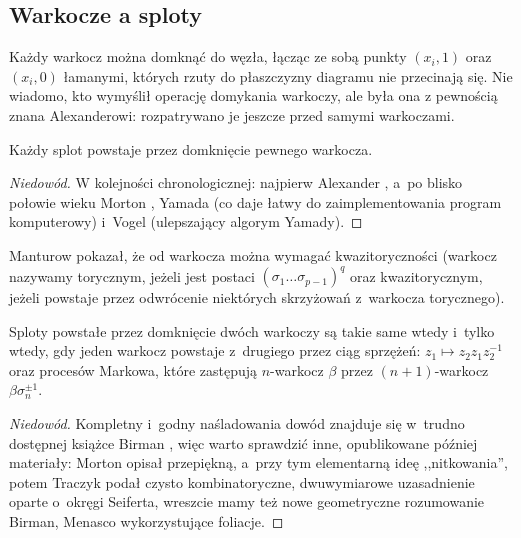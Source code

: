 
\subsection{Warkocze a sploty}
Każdy warkocz można domknąć do węzła, łącząc ze sobą punkty $(x_i, 1)$ oraz $(x_i, 0)$ łamanymi, których rzuty do płaszczyzny diagramu nie przecinają się.
%
Nie wiadomo, kto wymyślił operację domykania warkoczy, ale była ona z pewnością znana Alexanderowi: rozpatrywano je jeszcze przed samymi warkoczami.
%

\begin{theorem}[Alexander, 1923]
%
\label{thm:alexander}%
    Każdy splot powstaje przez domknięcie pewnego warkocza.
\end{theorem}

\begin{proof}[Niedowód]
    W kolejności chronologicznej:
    najpierw Alexander \cite{alexander1923},
%
    a~po blisko połowie wieku Morton \cite{mortonhr1986},
%
    Yamada \cite{yamada1987} (co daje łatwy do zaimplementowania program komputerowy)
%
    i~Vogel \cite{vogel1990} (ulepszający algorym Yamady).
%
\end{proof}

Manturow \cite{manturov2002} pokazał, że od warkocza można wymagać kwazitoryczności (warkocz nazywamy torycznym, jeżeli jest postaci $(\sigma_1 \ldots \sigma_{p-1})^q$ oraz kwazitorycznym, jeżeli powstaje przez odwrócenie niektórych skrzyżowań z~warkocza torycznego).
%
%
%

\begin{theorem}[Markow, 1936]
%
    Sploty powstałe przez domknięcie dwóch warkoczy są takie same wtedy i~tylko wtedy, gdy jeden warkocz powstaje z~drugiego przez ciąg sprzężeń: $z_1 \mapsto z_2 z_1 z_2^{-1}$ oraz procesów Markowa, które zastępują $n$-warkocz $\beta$ przez $(n+1)$-warkocz $\beta\sigma_n^{\pm 1}$.
\end{theorem}

\begin{proof}[Niedowód]
    Kompletny i~godny naśladowania dowód znajduje się w~trudno dostępnej książce Birman \cite{birman1974}, więc warto sprawdzić inne, opublikowane później materiały:
%
    Morton \cite{mortonhr1986} opisał przepiękną, a~przy tym elementarną ideę ,,nitkowania'',
%
    potem Traczyk \cite{traczyk1998} podał czysto kombinatoryczne, dwuwymiarowe uzasadnienie oparte o~okręgi Seiferta,
%
    wreszcie mamy też nowe geometryczne rozumowanie Birman, Menasco \cite{birman2002} wykorzystujące foliacje.
%
%
\end{proof}

